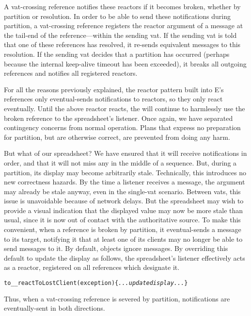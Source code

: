 \documentclass{llncs}
\begin{document}
A vat-crossing reference notifies these reactors if it becomes broken,
whether by partition or resolution. In order to be able to send these
notifications during partition, a vat-crossing reference registers the
reactor argument of a  message at the tail-end of
the reference---within the sending vat. If the sending vat is told
that one of these references has resolved, it re-sends equivalent
 messages to this resolution. If the sending vat
decides that a partition has occurred (perhaps because the internal
keep-alive timeout has been exceeded), it breaks all outgoing
references and notifies all registered reactors.

For all the reasons previously explained, the reactor pattern built
into E's references only eventual-sends notifications to reactors, so
they only react eventually. Until the above reactor reacts, the
 will continue to harmlessly use the broken
reference to the spreadsheet's listener. Once again, we have separated
contingency concerns from normal operation. Plans that express no
preparation for partition, but are otherwise correct, are prevented
from doing any harm.

But what of our spreadsheet? We have ensured that it will receive
 notifications in order, and that it will not miss
any in the middle of a sequence. But, during a partition, its display
may become arbitrarily stale. Technically, this introduces no new
correctness hazards. By the time a listener receives a
 message, the  argument may already
be stale anyway, even in the single-vat scenario. Between vats, this
issue is unavoidable because of network delays. But the spreadsheet
may wish to provide a visual indication that the displayed value may
now be more stale than usual, since it is now out of contact with the
authoritative source. To make this convenient, when a reference is
broken by partition, it eventual-sends a 
message to its target, notifying it that at least one of its clients
may no longer be able to send messages to it. By default, objects
ignore  messages. By overriding this
default to update the display as follows, the spreadsheet's listener
effectively acts as a reactor, registered on all references which
designate it.
%
\begin{alltt}
    to \_\_reactToLostClient(exception) \{ {\it ...update display...} \}
\end{alltt}
%
Thus, when a vat-crossing reference is severed by partition,
notifications are eventually-sent in both directions.
\end{document}
